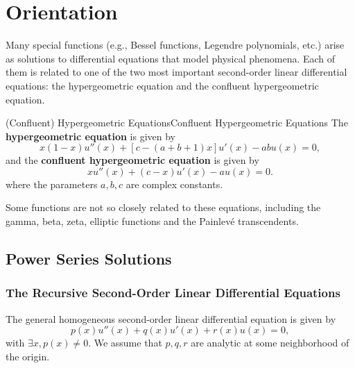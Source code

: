 \documentclass[../main.tex]{subfiles}
\begin{document}
\chapter{Orientation}

Many special functions (e.g., Bessel functions, Legendre polynomials, etc.) arise as solutions to differential equations that model physical phenomena. Each of them is related to one of the two most important second-order linear differential equations: the hypergeometric equation and the confluent hypergeometric equation.

\begin{definition}{(Confluent) Hypergeometric Equations}{Confluent Hypergeometric Equations}
	The \textbf{hypergeometric equation} is given by
	\begin{equation}\label{eq:hypergeometric-equation}
		x(1-x) u''(x) + [c - (a+b+1)x] u'(x) - ab u(x) = 0,
	\end{equation}
	and the \textbf{confluent hypergeometric equation} is given by
	\begin{equation}\label{eq:confluent-hypergeometric-equation}
		x u''(x) + (c - x) u'(x) - a u(x) = 0.
	\end{equation}
	where the parameters $a,b,c$ are complex constants.
\end{definition}

Some functions are not so closely related to these equations, including the gamma, beta, zeta, elliptic functions and the Painlev\'e transcendents.

\section{Power Series Solutions}

\subsection{The Recursive Second-Order Linear Differential Equations}
The general homogeneous second-order linear differential equation is given by
\begin{equation}
	p(x) u''(x) + q(x) u'(x) + r(x) u(x) = 0,
\end{equation}
with $\exists x,p(x) \neq 0$. We assume that $p,q,r$ are analytic at some neighborhood of the origin.
\end{document}
